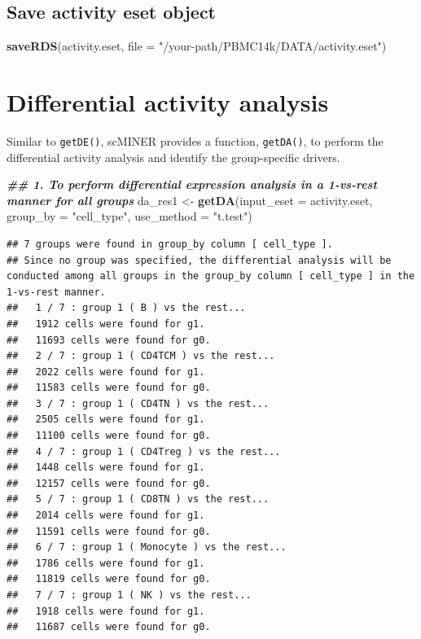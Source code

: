 \documentclass[
  12pt,
]{book}
\newenvironment{Shaded}{\begin{snugshade}}{\end{snugshade}}
\newcommand{\AttributeTok}[1]{\textcolor[rgb]{0.13,0.29,0.53}{#1}}
\newcommand{\DocumentationTok}[1]{\textcolor[rgb]{0.56,0.35,0.01}{\textbf{\textit{#1}}}}
\newcommand{\FunctionTok}[1]{\textcolor[rgb]{0.13,0.29,0.53}{\textbf{#1}}}
\newcommand{\NormalTok}[1]{#1}
\newcommand{\OtherTok}[1]{\textcolor[rgb]{0.56,0.35,0.01}{#1}}
\newcommand{\StringTok}[1]{\textcolor[rgb]{0.31,0.60,0.02}{#1}}
\begin{document}
\subsection{Save activity eset object}\label{save-activity-eset-object}

\begin{Shaded}
\begin{Highlighting}[]
\FunctionTok{saveRDS}\NormalTok{(activity.eset, }\AttributeTok{file =} \StringTok{"/your{-}path/PBMC14k/DATA/activity.eset"}\NormalTok{)}
\end{Highlighting}
\end{Shaded}

\section{Differential activity analysis}\label{differential-activity-analysis}

Similar to \texttt{getDE()}, scMINER provides a function, \texttt{getDA()}, to perform the differential activity analysis and identify the group-specific drivers.

\begin{Shaded}
\begin{Highlighting}[]
\DocumentationTok{\#\# 1. To perform differential expression analysis in a 1{-}vs{-}rest manner for all groups}
\NormalTok{da\_res1 }\OtherTok{\textless{}{-}} \FunctionTok{getDA}\NormalTok{(}\AttributeTok{input\_eset =}\NormalTok{ activity.eset, }\AttributeTok{group\_by =} \StringTok{"cell\_type"}\NormalTok{, }\AttributeTok{use\_method =} \StringTok{"t.test"}\NormalTok{)}
\end{Highlighting}
\end{Shaded}

\begin{verbatim}
## 7 groups were found in group_by column [ cell_type ].
## Since no group was specified, the differential analysis will be conducted among all groups in the group_by column [ cell_type ] in the 1-vs-rest manner.
##   1 / 7 : group 1 ( B ) vs the rest...
##   1912 cells were found for g1.
##   11693 cells were found for g0.
##   2 / 7 : group 1 ( CD4TCM ) vs the rest...
##   2022 cells were found for g1.
##   11583 cells were found for g0.
##   3 / 7 : group 1 ( CD4TN ) vs the rest...
##   2505 cells were found for g1.
##   11100 cells were found for g0.
##   4 / 7 : group 1 ( CD4Treg ) vs the rest...
##   1448 cells were found for g1.
##   12157 cells were found for g0.
##   5 / 7 : group 1 ( CD8TN ) vs the rest...
##   2014 cells were found for g1.
##   11591 cells were found for g0.
##   6 / 7 : group 1 ( Monocyte ) vs the rest...
##   1786 cells were found for g1.
##   11819 cells were found for g0.
##   7 / 7 : group 1 ( NK ) vs the rest...
##   1918 cells were found for g1.
##   11687 cells were found for g0.
\end{verbatim}
\end{document}
